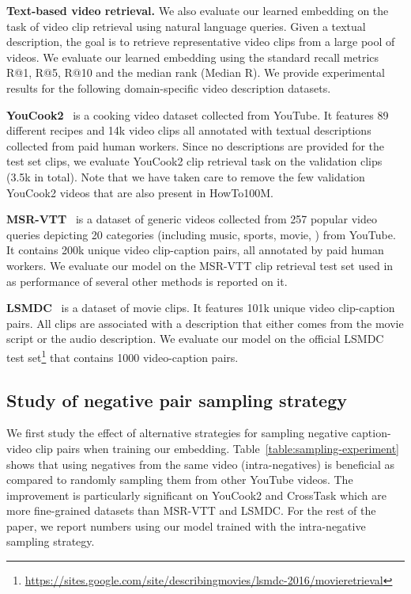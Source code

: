 \documentclass[10pt,twocolumn,letterpaper]{article}
\begin{document}
\noindent
\textbf{Text-based video retrieval.}
We also evaluate our learned embedding on the task of video clip retrieval using natural language queries.
Given a textual description, the goal is to retrieve representative video clips from a large pool of videos.
We evaluate our learned embedding using the standard recall metrics R@1, R@5, R@10 and the median rank (Median R).
We provide experimental results for the following domain-specific video description datasets.

{\bf  YouCook2}~\cite{youcook2} is a cooking video dataset collected from YouTube.
It features 89 different recipes and 14k video clips all annotated with textual descriptions collected from paid human workers.
Since no descriptions are provided for the test set clips, we evaluate YouCook2 clip retrieval task on the validation clips (3.5k in total). 
Note that we have taken care to remove the few validation YouCook2 videos that are also present in HowTo100M.
 
{\bf  MSR-VTT}~\cite{xu16msrvtt} is a dataset of generic videos collected from 257 popular video queries depicting 20 categories (including music, sports, movie, \etc) from YouTube.
It contains 200k unique video clip-caption pairs, all annotated by paid human workers.
We evaluate our model on the MSR-VTT clip retrieval test set used in~\cite{yu18joint} as performance of several other methods is reported on it.

{\bf  LSMDC}~\cite{rohrbach17movie} is a dataset of movie clips.
It features 101k unique video clip-caption pairs.
All clips are associated with a description that either comes from the movie script or the audio description.
We evaluate our model on the official LSMDC test set\footnote{\url{https://sites.google.com/site/describingmovies/lsmdc-2016/movieretrieval}} that contains 1000 video-caption pairs.





\subsection{Study of negative pair sampling strategy}
\label{subsec:sampling}
We first study the effect of alternative strategies for sampling negative caption-video clip pairs when training our embedding.
Table~\ref{table:sampling-experiment} shows that using negatives from the same video (intra-negatives) is beneficial as compared to randomly sampling them from other YouTube videos.
The improvement is particularly significant on YouCook2 and CrossTask which are more fine-grained datasets than MSR-VTT and LSMDC.
For the rest of the paper, we report numbers using our model trained with the intra-negative sampling strategy.
\end{document}
